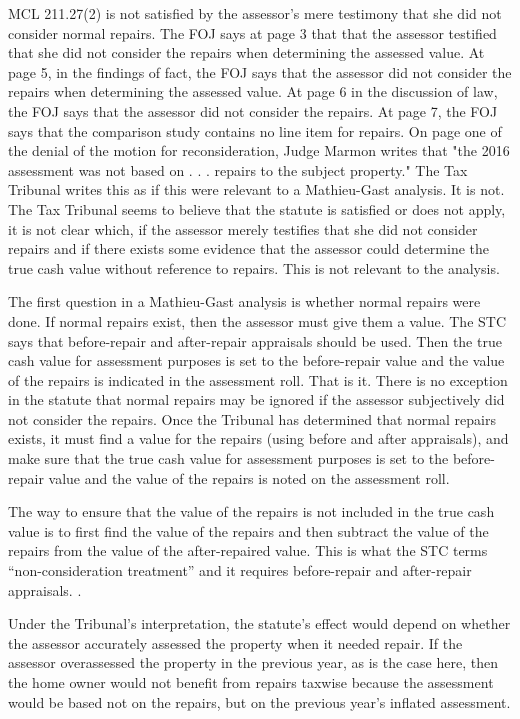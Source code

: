 MCL 211.27(2) is not satisfied by the assessor's mere testimony that she did not consider normal repairs.
The FOJ says at page 3 that that the assessor testified that she did not consider the repairs when determining the assessed value. At page 5, in the findings of fact, the FOJ says that the assessor did not consider the repairs when determining the assessed value. At page 6 in the discussion of law, the FOJ says that the assessor did not consider the repairs. At page 7, the FOJ says that the comparison study contains no line item for repairs. On page one of the denial of the motion for reconsideration, Judge Marmon writes that "the 2016 assessment was not based on . . . repairs to the subject property." The Tax Tribunal writes this as if this were relevant to a Mathieu-Gast analysis. It is not. The Tax Tribunal seems to believe that the statute is satisfied or does not apply, it is not clear which, if the assessor merely testifies that she did not consider repairs and if there exists some evidence that the assessor could determine the true cash value without reference to repairs. This is not relevant to the analysis.

The first question in a Mathieu-Gast analysis is whether normal repairs were done. If normal repairs exist, then the assessor must give them a value. The STC says that before-repair and after-repair appraisals should be used. Then the true cash value for assessment purposes is set to the before-repair value and the value of the repairs is indicated in the assessment roll. That is it. There is no exception in the statute that normal repairs may be ignored if the assessor subjectively did not consider the repairs. Once the Tribunal has determined that normal repairs exists, it must find a value for the repairs (using before and after appraisals), and make sure that the true cash value for assessment purposes is set to the before-repair value and the value of the repairs is noted on the assessment roll. 


The way to ensure that the value of the repairs is not included in the true cash value is to first find the value of the repairs and then subtract the value of the repairs from the value of the after-repaired value. This is what the STC terms ``non-consideration treatment'' and it requires before-repair and after-repair appraisals. . 


Under the Tribunal's interpretation, the statute's effect would depend on whether the assessor accurately assessed the property when it needed repair. If the assessor overassessed the property in the previous year, as is the case here, then the home owner would not benefit from repairs taxwise because the assessment would be based not on the repairs, but on the previous year's inflated assessment.


